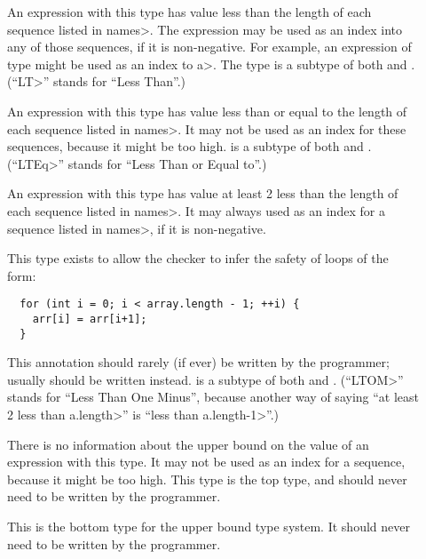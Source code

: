 \begin{description}

\item[]
  An expression with this type
  has value less than the length of each sequence listed in \<names>.
  The expression may be used as an index into any of those sequences,
  if it is non-negative.
  For example, an expression of type  might be
  used as an index to \<a>.
  The type  is a subtype of both
   and .
  (``\<LT>'' stands for ``Less Than''.)

\item[]
  An expression with this type
  has value less than or equal to the length of each sequence listed in \<names>.
  It may not be used as an index for these sequences, because it might be too high.
   is a subtype of both
   and .
  (``\<LTEq>'' stands for ``Less Than or Equal to''.)

\item[]
  An expression with this type
  has value at least 2 less than the length of each sequence listed in \<names>.
  It may always used as an index for a sequence listed in \<names>, if it is
  non-negative.

  This type exists to allow the checker to infer the safety of loops of
  the form:
\begin{Verbatim}
  for (int i = 0; i < array.length - 1; ++i) {
    arr[i] = arr[i+1];
  }
\end{Verbatim}
  This annotation should rarely (if ever) be written by the programmer; usually
  should be written instead.
   is a subtype of both
   and .
  (``\<LTOM>'' stands for ``Less Than One Minus'', because another way of
  saying ``at least 2 less than \<a.length>'' is ``less than \<a.length-1>''.)

\item[]
  There is no information about the upper bound on the value of an expression with this type.
  It may not be used as an index for a sequence, because it might be too high.
  This type is the top type, and should never need to be written by the
  programmer.

\item[]
  This is the bottom type for the upper bound type system. It should
  never need to be written by the programmer.

\end{description}


